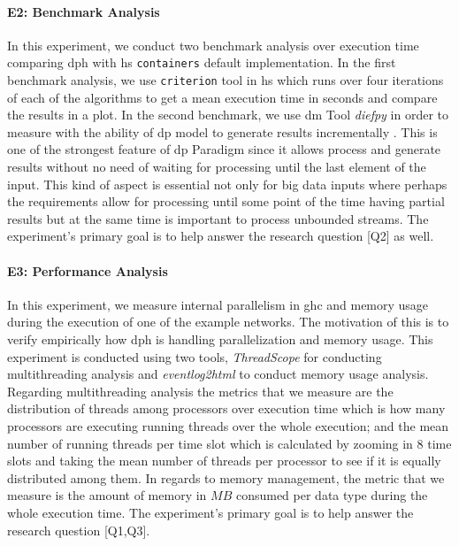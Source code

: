 \documentclass[preprint]{elsarticle}
\begin{document}
\paragraph{E2: Benchmark Analysis}
In this experiment, we conduct two benchmark analysis over execution time comparing \acrshort{dph} with \acrshort{hs} \texttt{containers} default implementation. In the first benchmark analysis, we use \texttt{criterion} \cite{criterion} tool in \acrshort{hs} which runs over four iterations of each of the algorithms to get a mean execution time in seconds and compare the results in a plot. In the second benchmark, we use \acrfull{dm} Tool \emph{diefpy} \cite{diefpy} in order to measure with the ability of \acrshort{dp} model to generate results incrementally \cite{diefpaper}. This is one of the strongest feature of \acrshort{dp} Paradigm since it allows process and generate results without no need of waiting for processing until the last element of the input. This kind of aspect is essential not only for big data inputs where perhaps the requirements allow for processing until some point of the time having partial results but at the same time is important to process unbounded streams. The experiment's primary goal is to help answer the research question [Q2] as well.

\paragraph{E3: Performance Analysis}
In this experiment, we measure internal parallelism in \acrshort{ghc} and memory usage during the execution of one of the example networks. The motivation of this is to verify empirically how \acrshort{dph} is handling parallelization and memory usage. This experiment is conducted using two tools, \textit{ThreadScope} \cite{threadscope} for conducting multithreading analysis and \textit{eventlog2html} \cite{eventlog2html} to conduct memory usage analysis. Regarding multithreading analysis the metrics that we measure are the distribution of threads among processors over execution time which is how many processors are executing running threads over the whole execution; and the mean number of running threads per time slot which is calculated by zooming in $8$ time slots and taking the mean number of threads per processor to see if it is equally distributed among them. In regards to memory management, the metric that we measure is the amount of memory in $MB$ consumed per data type during the whole execution time. The experiment's primary goal is to help answer the research question [Q1,Q3].
\end{document}
